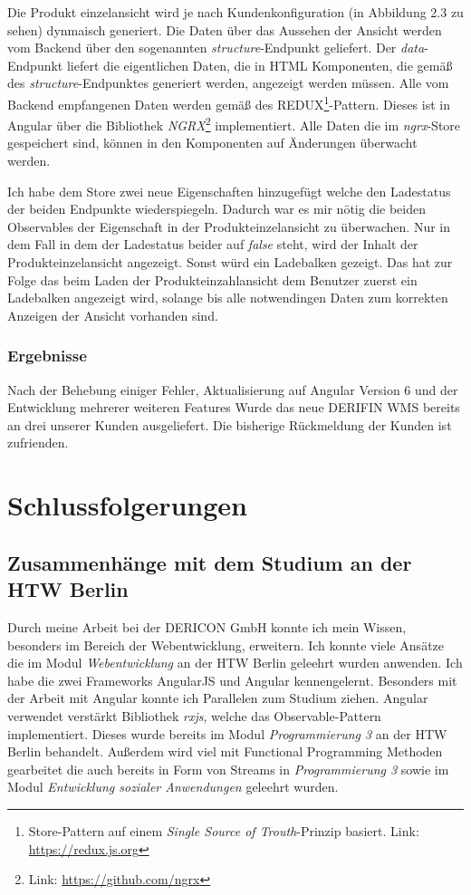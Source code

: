 \documentclass[chapterprefix=false, 12pt, a4paper, oneside, parskip=half, listof=totoc, bibliography=totoc, numbers=noendperiod]{scrbook}
\begin{document}
    Die Produkt einzelansicht wird je nach Kundenkonfiguration (in Abbildung 2.3 zu sehen) dynmaisch generiert.
    Die Daten über das Aussehen der Ansicht werden vom Backend über den sogenannten \textit{structure}-Endpunkt geliefert.
    Der \textit{data}-Endpunkt liefert die eigentlichen Daten, die in HTML Komponenten, die gemäß des \textit{structure}-Endpunktes
    generiert werden, angezeigt werden müssen. Alle vom Backend empfangenen Daten werden gemäß des
    REDUX\footnote{Store-Pattern auf einem \textit{Single Source of Trouth}-Prinzip basiert. Link: \url{https://redux.js.org}}-Pattern.
    Dieses ist in Angular über die Bibliothek \textit{NGRX}\footnote{Link: \url{https://github.com/ngrx}} implementiert.
    Alle Daten die im \textit{ngrx}-Store gespeichert sind, können in den Komponenten auf Änderungen überwacht werden.

    Ich habe dem Store zwei neue Eigenschaften hinzugefügt welche den Ladestatus der beiden Endpunkte wiederspiegeln.
    Dadurch war es mir nötig die beiden Observables der Eigenschaft in der Produkteinzelansicht zu überwachen.
    Nur in dem Fall in dem der Ladestatus beider auf \textit{false} steht, wird der Inhalt der Produkteinzelansicht angezeigt.
    Sonst würd ein Ladebalken gezeigt. Das hat zur Folge das beim Laden der Produkteinzahlansicht dem Benutzer zuerst ein Ladebalken
    angezeigt wird, solange bis alle notwendingen Daten zum korrekten Anzeigen der Ansicht vorhanden sind.


    \subsection{Ergebnisse}

    Nach der Behebung einiger Fehler, Aktualisierung auf Angular Version 6 und der Entwicklung mehrerer weiteren Features
    Wurde das neue DERIFIN WMS bereits an drei unserer Kunden ausgeliefert. Die bisherige Rückmeldung der Kunden ist zufrienden.

    \chapter{Schlussfolgerungen}

    \section{Zusammenhänge mit dem Studium an der HTW Berlin}

    Durch meine Arbeit bei der DERICON GmbH konnte ich mein Wissen, besonders im Bereich der Webentwicklung, erweitern.
    Ich konnte viele Ansätze die im Modul \textit{Webentwicklung} an der HTW  Berlin geleehrt wurden anwenden. Ich habe die zwei Frameworks
    AngularJS und Angular kennengelernt. Besonders mit der Arbeit mit Angular konnte ich Parallelen zum Studium ziehen. Angular
    verwendet verstärkt Bibliothek \textit{rxjs}, welche das Observable-Pattern implementiert. Dieses wurde bereits im Modul
    \textit{Programmierung 3} an der HTW Berlin behandelt. Außerdem wird viel mit Functional Programming Methoden gearbeitet die auch bereits in Form
    von Streams in \textit{Programmierung 3} sowie im Modul \textit{Entwicklung sozialer Anwendungen} geleehrt wurden.
\end{document}
